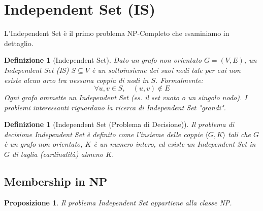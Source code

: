\documentclass[a4paper, 11pt]{book} %
\newtheorem{definition}[theorem]{Definizione}
\newtheorem{proposition}[theorem]{Proposizione}
\theoremstyle{definition}
\begin{document}
\section{Independent Set (IS)}

L'Independent Set è il primo problema NP-Completo che esaminiamo in dettaglio.

\begin{definition}[Independent Set]
Dato un grafo non orientato $G=(V, E)$, un \emph{Independent Set} (IS) $S \subseteq V$ è un sottoinsieme dei suoi nodi tale per cui non esiste alcun arco tra nessuna coppia di nodi in $S$. Formalmente:
\[ \forall u, v \in S, \quad (u, v) \notin E \]
Ogni grafo ammette un Independent Set (es. il set vuoto o un singolo nodo). I problemi interessanti riguardano la ricerca di Independent Set "grandi".
\end{definition}

\begin{definition}[Independent Set (Problema di Decisione)]
Il problema di decisione \emph{Independent Set} è definito come l'insieme delle coppie $\langle G, K \rangle$ tali che $G$ è un grafo non orientato, $K$ è un numero intero, ed esiste un Independent Set in $G$ di taglia (cardinalità) almeno $K$.
\end{definition}

\subsection{Membership in NP}

\begin{proposition}
Il problema \emph{Independent Set} appartiene alla classe NP.
\end{proposition}
\end{document}
